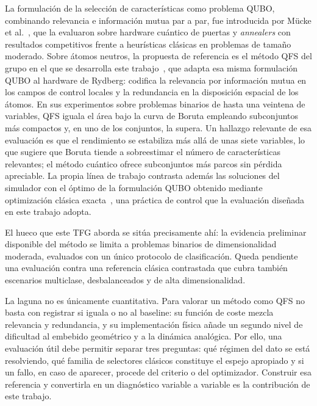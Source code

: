 La formulación de la selección de características como problema QUBO,
combinando relevancia e información mutua par a par, fue introducida
por Mücke et al.~\cite{mucke2023}, que la evaluaron sobre hardware
cuántico de puertas y \textit{annealers} con resultados competitivos
frente a heurísticas clásicas en problemas de tamaño moderado. Sobre
átomos neutros, la propuesta de referencia es el método QFS del grupo
en el que se desarrolla este trabajo~\cite{orquin2026}, que adapta esa
misma formulación QUBO al hardware de Rydberg: codifica la relevancia
por información mutua en los campos de control locales y la redundancia
en la disposición espacial de los átomos. En sus experimentos sobre
problemas binarios de hasta una veintena de variables, QFS iguala el
área bajo la curva de Boruta empleando subconjuntos más compactos y, en
uno de los conjuntos, la supera. Un hallazgo relevante de esa
evaluación es que el rendimiento se estabiliza más allá de unas siete
variables, lo que sugiere que Boruta tiende a sobreestimar el número de
características relevantes; el método cuántico ofrece subconjuntos más
parcos sin pérdida apreciable. La propia línea de trabajo contrasta
además las soluciones del simulador con el óptimo de la formulación
QUBO obtenido mediante optimización clásica exacta~\cite{orquin2026},
una práctica de control que la evaluación diseñada en este trabajo
adopta.

El hueco que este TFG aborda se sitúa precisamente ahí: la evidencia
preliminar disponible del método se limita a problemas binarios de
dimensionalidad moderada, evaluados con un único protocolo de
clasificación. Queda pendiente una evaluación contra una referencia
clásica contrastada que cubra también escenarios multiclase,
desbalanceados y de alta dimensionalidad.

La laguna no es únicamente cuantitativa. Para valorar un método como
QFS no basta con registrar si iguala o no al baseline: su función de
coste mezcla relevancia y redundancia, y su implementación física añade
un segundo nivel de dificultad al embebido geométrico y a la dinámica
analógica. Por ello, una evaluación útil debe permitir separar tres
preguntas: qué régimen del dato se está resolviendo, qué familia de
selectores clásicos constituye el espejo apropiado y si un fallo, en
caso de aparecer, procede del criterio o del optimizador. Construir esa
referencia y convertirla en un diagnóstico variable a variable es la
contribución de este trabajo.
